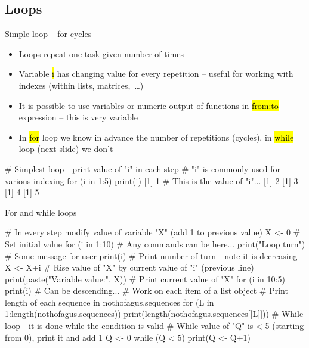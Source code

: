 \documentclass[compress, ucs, xelatex, 11pt, xcolor=svgnames,
  hyperref={
    bookmarks=true,
    unicode=true,
    colorlinks=true,
    pdftitle={Molecular data in R},
    plainpages=false,
    pdfauthor={Vojtech Zeisek},
    pdfsubject={Course about phylogeny and evolution in R},
    pdfcreator={XeLaTeX},
    pdfkeywords={R, evolution, phylogeny, molecular data},
    linkcolor=Tomato,
    anchorcolor=SaddleBrown,
    citecolor=Goldenrod,
    filecolor=DarkMagenta,
    menucolor=Sienna,
    urlcolor=DarkTurquoise,
    pdftex},
  url={hyphens, lowtilde} %
  ]{beamer}
\renewcommand{\texttt}[1]{\hl{\ttfamily #1}}
\begin{document}
\subsection{Loops}

\begin{frame}[fragile]{Simple loop -- for cycles}
  \begin{itemize}
    \item Loops repeat one task given number of times
    \item Variable \texttt{i} has changing value for every repetition -- useful for working with indexes (within lists, matrices,~\ldots)
    \item It is possible to use variables or numeric output of functions in \texttt{from:to} expression -- this is very variable
    \item In \texttt{for} loop we know in advance the number of repetitions (cycles), in \texttt{while} loop (next slide) we don't
  \end{itemize}
  \begin{spluscode}
    # Simplest loop - print value of "i" in each step
    # "i" is commonly used for various indexing
    for (i in 1:5) { print(i) }
    [1] 1 # This is the value of "i"...
    [1] 2
    [1] 3
    [1] 4
    [1] 5
  \end{spluscode}
\end{frame}

\begin{frame}[fragile]{For and while loops}
  \begin{spluscode}
    # In every step modify value of variable "X" (add 1 to previous value)
    X <- 0 # Set initial value
    for (i in 1:10) {
      # Any commands can be here...
      print("Loop turn") # Some message for user
      print(i) # Print number of turn - note it is decreasing
      X <- X+i # Rise value of "X" by current value of "i" (previous line)
      print(paste("Variable value:", X)) # Print current value of "X"
      }
    for (i in 10:5) { print(i) } # Can be descending...
    # Work on each item of a list object
    # Print length of each sequence in nothofagus.sequences
    for (L in 1:length(nothofagus.sequences)) {
      print(length(nothofagus.sequences[[L]])) }
    # While loop - it is done while the condition is valid
    # While value of "Q" is < 5 (starting from 0), print it and add 1
    Q <- 0
    while (Q < 5) { print(Q <- Q+1) }
  \end{spluscode}
\end{frame}
\end{document}
